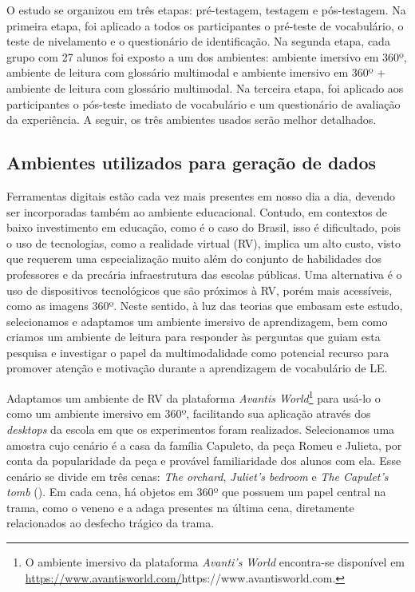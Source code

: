 O estudo se organizou em três etapas: pré-testagem, testagem e
pós-testagem. Na primeira etapa, foi aplicado a todos os participantes o
pré-teste de vocabulário, o teste de nivelamento e o questionário de
identificação. Na segunda etapa, cada grupo com 27 alunos foi exposto a
um dos ambientes: ambiente imersivo em 360º, ambiente de leitura com
glossário multimodal e ambiente imersivo em 360º + ambiente de leitura
com glossário multimodal. Na terceira etapa, foi aplicado aos
participantes o pós-teste imediato de vocabulário e um questionário de
avaliação da experiência. A seguir, os três ambientes usados serão
melhor detalhados.


\subsection{Ambientes utilizados para geração de dados }\label{subs-sec-ambientesutilizados}

Ferramentas digitais estão cada vez mais presentes em nosso dia a dia,
devendo ser incorporadas também ao ambiente educacional. Contudo, em
contextos de baixo investimento em educação, como é o caso do Brasil,
isso é dificultado, pois o uso de tecnologias, como a realidade virtual
(RV), implica um alto custo, visto que requerem uma especialização muito
além do conjunto de habilidades dos professores e da precária
infraestrutura das escolas públicas. Uma alternativa é o uso de
dispositivos tecnológicos que são próximos à RV, porém mais acessíveis,
como as imagens 360º. Neste sentido, à luz das teorias que embasam este
estudo, selecionamos e adaptamos um ambiente imersivo de aprendizagem,
bem como criamos um ambiente de leitura para responder às perguntas que
guiam esta pesquisa e investigar o papel da multimodalidade como
potencial recurso para promover atenção e motivação durante a
aprendizagem de vocabulário de LE.

Adaptamos um ambiente de RV da plataforma \emph{Avanti\textquotesingle s
World}\footnote{O ambiente imersivo da plataforma \emph{Avanti's World}
  encontra-se disponível em
  \url{https://www.avantisworld.com/}{https://www.avantisworld.com}.}
para usá-lo o como um ambiente imersivo em 360º, facilitando sua
aplicação através dos \emph{desktops} da escola em que os experimentos
foram realizados. Selecionamos uma amostra cujo cenário é a casa da
família Capuleto, da peça Romeu e Julieta, por conta da popularidade da
peça e provável familiaridade dos alunos com ela. Esse cenário se divide
em três cenas: \emph{The orchard}, \emph{Juliet's bedroom} e \emph{The
Capulet's tomb} (). Em cada cena, há objetos em 360º que possuem
um papel central na trama, como o veneno e a adaga presentes na última
cena, diretamente relacionados ao desfecho trágico da trama.

